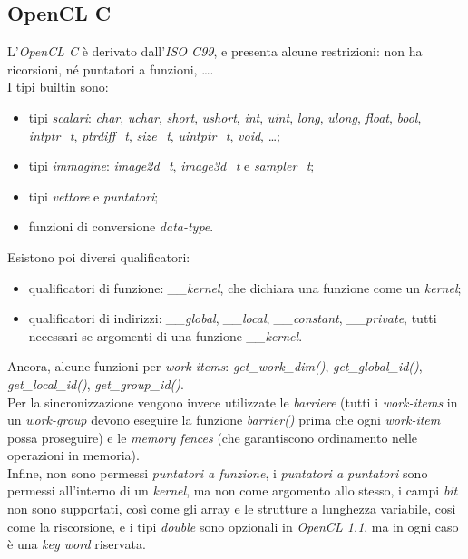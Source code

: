 \subsection{OpenCL C}
L'\textit{OpenCL C} è derivato dall'\textit{ISO C99}, e presenta alcune restrizioni: non ha ricorsioni, né puntatori a funzioni, \ldots . \\
I tipi builtin sono:
\begin{itemize}
	\item tipi \textit{scalari}: \textit{char}, \textit{uchar}, \textit{short}, \textit{ushort}, \textit{int}, \textit{uint}, \textit{long}, \textit{ulong}, \textit{float}, \textit{bool}, \textit{intptr\_t}, \textit{ptrdiff\_t}, \textit{size\_t}, \textit{uintptr\_t}, \textit{void}, \ldots;
	\item tipi \textit{immagine}: \textit{image2d\_t}, \textit{image3d\_t} e \textit{sampler\_t};
	\item tipi \textit{vettore} e \textit{puntatori};
	\item funzioni di conversione \textit{data-type}.
\end{itemize}
Esistono poi diversi qualificatori:
\begin{itemize}
	\item qualificatori di funzione: \textit{\_\_kernel}, che dichiara una funzione come un \textit{kernel};
	\item qualificatori di indirizzi: \textit{\_\_global}, \textit{\_\_local}, \textit{\_\_constant}, \textit{\_\_private}, tutti necessari se argomenti di una funzione \textit{\_\_kernel}.
\end{itemize}
Ancora, alcune funzioni per \textit{work-items}: \textit{get\_work\_dim()}, \textit{get\_global\_id()}, \textit{get\_local\_id()}, \textit{get\_group\_id()}. \\
Per la sincronizzazione vengono invece utilizzate le \textit{barriere} (tutti i \textit{work-items} in un \textit{work-group} devono eseguire la funzione \textit{barrier()} prima che ogni \textit{work-item} possa proseguire) e le \textit{memory fences} (che garantiscono ordinamento nelle operazioni in memoria). \\
Infine, non sono permessi \textit{puntatori a funzione}, i \textit{puntatori a puntatori} sono permessi all'interno di un \textit{kernel}, ma non come argomento allo stesso, i campi \textit{bit} non sono supportati, così come gli array e le strutture a lunghezza variabile, così come la riscorsione, e i tipi \textit{double} sono opzionali in \textit{OpenCL 1.1}, ma in ogni caso è una \textit{key word} riservata.